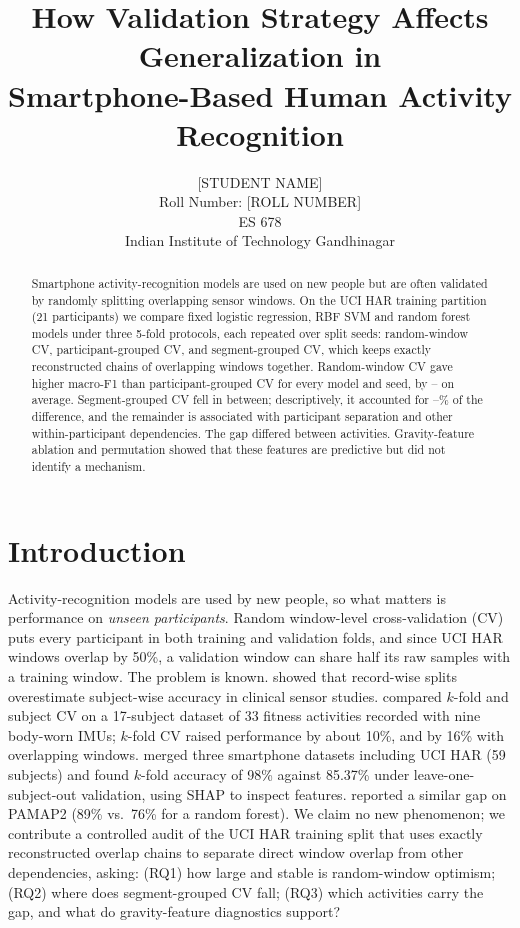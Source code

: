 \documentclass{article}
\title{How Validation Strategy Affects Generalization in\\Smartphone-Based Human Activity Recognition}
\author{%
  [STUDENT NAME] \\
  Roll Number: [ROLL NUMBER] \\
  ES 678 \\
  Indian Institute of Technology Gandhinagar
}
\begin{document}
\maketitle

\begin{abstract}
Smartphone activity-recognition models are used on new people but are often validated by randomly splitting overlapping sensor windows. On the UCI HAR training partition (21 participants) we compare fixed logistic regression, RBF SVM and random forest models under three 5-fold protocols, each repeated over \Nnseeds{} split seeds: random-window CV, participant-grouped CV, and segment-grouped CV, which keeps exactly reconstructed chains of overlapping windows together. Random-window CV gave higher macro-F1 than participant-grouped CV for every model and seed, by \Ngapmodelmin--\Ngapmodelmax{} on average. Segment-grouped CV fell in between; descriptively, it accounted for \Noverlapsharemin--\Noverlapsharemax\% of the difference, and the remainder is associated with participant separation and other within-participant dependencies. The gap differed between activities. Gravity-feature ablation and permutation showed that these features are predictive but did not identify a mechanism.
\end{abstract}

\section{Introduction}
Activity-recognition models are used by new people, so what matters is performance on \emph{unseen participants}. Random window-level cross-validation (CV) puts every participant in both training and validation folds, and since UCI HAR windows overlap by 50\%, a validation window can share half its raw samples with a training window. The problem is known. \citet{saeb2017} showed that record-wise splits overestimate subject-wise accuracy in clinical sensor studies. \citet{dehghani2019} compared $k$-fold and subject CV on a 17-subject dataset of 33 fitness activities recorded with nine body-worn IMUs; $k$-fold CV raised performance by about 10\%, and by 16\% with overlapping windows. \citet{braganca2022} merged three smartphone datasets including UCI HAR (59 subjects) and found $k$-fold accuracy of 98\% against 85.37\% under leave-one-subject-out validation, using SHAP to inspect features. \citet{rehman2024} reported a similar gap on PAMAP2 (89\% vs.\ 76\% for a random forest). We claim no new phenomenon; we contribute a controlled audit of the UCI HAR training split that uses exactly reconstructed overlap chains to separate direct window overlap from other dependencies, asking: (RQ1) how large and stable is random-window optimism; (RQ2) where does segment-grouped CV fall; (RQ3) which activities carry the gap, and what do gravity-feature diagnostics support?
\end{document}
